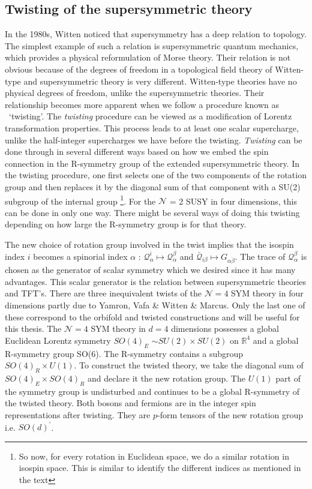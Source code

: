 \subsection{Twisting of the supersymmetric theory}
In the 1980s, Witten noticed that supersymmetry has a deep relation to topology. 
The simplest example of such a relation is supersymmetric quantum mechanics, 
which provides a physical reformulation of Morse theory. 
Their relation is not obvious because of the degrees of freedom in a topological field theory of 
Witten-type and supersymmetric theory is very different. 
Witten-type theories have no physical degrees of freedom, unlike the supersymmetric theories. 
Their relationship becomes more apparent when we follow a procedure known as ~`twisting'. 
The \textit{twisting} procedure can be viewed as a modification of Lorentz transformation properties. 
This process leads to at least one scalar supercharge, unlike the half-integer supercharges we have before the twisting. 
\textit{Twisting} can be done through in several different ways based on how we embed the spin connection 
in the R-symmetry group of the extended supersymmetric theory. 
In the twisting procedure, one first selects one of the two components of the rotation group and 
then replaces it by the diagonal sum of that component with a SU(2) subgroup of the internal group 
\footnote{So now, for every rotation in Euclidean space, we do a similar rotation in isospin space. 
This is similar to identify the different indices as mentioned in the text}. For the $\mathcal{N}$ = 2 
SUSY in four dimensions, this can be done in only one way. There might be several ways of doing
this twisting depending on how large the R-symmetry group is for that theory.

The new choice of rotation group involved in the twist implies that the isospin index $\textit{i}$ 
becomes a spinorial index $\alpha$ : $ \mathcal{Q}^{i}_{\alpha} \mapsto \mathcal{Q}^{\beta}_{\alpha}$ 
and $\bar{\mathcal{Q}}_{i \beta} \mapsto G_{\alpha\dot{\beta}}$. The trace of $ \mathcal{Q}^{\beta}_{\alpha}$ 
is chosen as the generator of scalar symmetry which we desired since it has many advantages. 
This scalar generator is the relation between supersymmetric theories and TFT's. There are three
 inequivalent twists of the $\mathcal{N}=4$ SYM theory in four dimensions partly due to Yamron, 
 Vafa \& Witten  \& Marcus. Only the last one of these correspond to the orbifold and twisted constructions 
 and will be useful for this thesis. The $\mathcal{N}=4$ SYM theory in $d=4$ dimensions possesses a 
 global Euclidean Lorentz symmetry $SO(4)_{E}$ $\sim SU(2) \times SU(2) $ on $\mathbb{R}^{4}$ 
 and a global R-symmetry group SO(6). 
The R-symmetry contains a subgroup $SO(4)_{R} \times U(1)$. 
To construct the twisted theory, we take the diagonal sum of $SO(4)_{E} \times SO(4)_{R}$ and declare it the new rotation group. 
The $U(1)$ part of the symmetry group is undisturbed and continues to be a global R-symmetry of the twisted theory.
Both bosons and fermions are in the integer spin representations after twisting. They are $p$-form tensors of the 
new rotation group i.e. $SO(d)^{\prime}$. 

